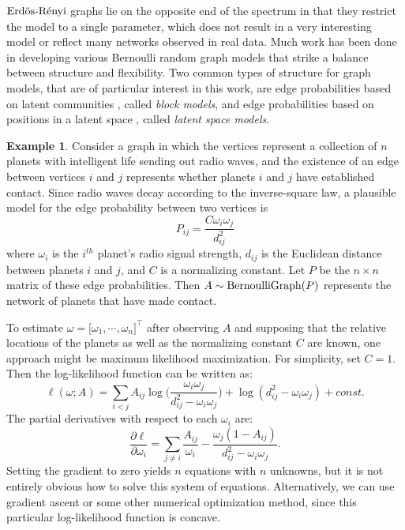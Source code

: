 \documentclass[
  12pt,
]{article}
\theoremstyle{definition}
\theoremstyle{definition}
\newtheorem{example}{Example}[section]
\theoremstyle{definition}
\theoremstyle{definition}
\theoremstyle{remark}
\begin{document}
\(\text{Erd\"{o}s-R\'{e}nyi}\) graphs lie on the opposite end of the spectrum in that they restrict the model to a single parameter, which does not result in a very interesting model or reflect many networks observed in real data.
Much work has been done in developing various Bernoulli random graph models that strike a balance between structure and flexibility.
Two common types of structure for graph models, that are of particular interest in this work, are edge probabilities based on latent communities \citep{doi:10.1080/0022250X.1971.9989788, NIPS2008_3578, Karrer_2011, 307cbeb9b1be48299388437423d94bf1}, called \emph{block models}, and edge probabilities based on positions in a latent space \citep{10.1007/978-3-540-77004-6_11, rubindelanchy2017statistical}, called \emph{latent space models}.

\begin{example}
Consider a graph in which the vertices represent a collection of $n$ planets with intelligent life sending out radio waves, and the existence of an edge between vertices $i$ and $j$ represents whether planets $i$ and $j$ have established contact.  
Since radio waves decay according to the inverse-square law, a plausible model for the edge probability between two vertices is 
$$P_{ij} = \frac{C \omega_i \omega_j}{d_{ij}^2}$$ 
where $\omega_i$ is the $i^{th}$ planet's radio signal strength, $d_{ij}$ is the Euclidean distance between planets $i$ and $j$, and $C$ is a normalizing constant. 
Let $P$ be the $n \times n$ matrix of these edge probabilities. 
Then $A \sim \mathrm{BernoulliGraph}(P)$ represents the network of planets that have made contact. 

To estimate $\omega = \Big[ \omega_1, \cdots, \omega_n \Big]^\top$ after observing $A$ and supposing that the relative locations of the planets as well as the normalizing constant $C$ are known, one approach might be maximum likelihood maximization. 
For simplicity, set $C = 1$. 
Then the log-likelihood function can be written as:
$$
\ell(\omega; A) = 
\sum_{i < j} A_{ij} \log \bigg( \frac{\omega_i \omega_j}{d_{ij}^2 -
\omega_i \omega_j} \bigg) + \log (d_{ij}^2 - \omega_i \omega_j) + const.
$$
The partial derivatives with respect to each $\omega_i$ are:
$$
\frac{\partial \ell}{\partial \omega_i} = \sum_{j \neq i} \frac{A_{ij}}{\omega_i} - \frac{\omega_j (1 - A_{ij})}{d_{ij}^2 - \omega_i \omega_j}.
$$
Setting the gradient to zero yields $n$ equations with $n$ unknowns, but it is not entirely obvious how to solve this system of equations. 
Alternatively, we can use gradient ascent or some other numerical optimization method, since this particular log-likelihood function is concave. 
\end{example}
\end{document}
